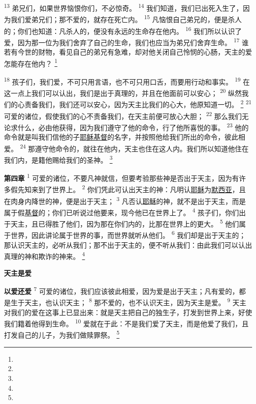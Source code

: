\begin{multicols}{2}
\textsuperscript{13}
弟兄们，如果世界恼恨你们，不必惊奇。
\textsuperscript{14}
我们知道，我们已出死入生了，因为我们爱弟兄们；那不爱的，就存在死亡内。
\textsuperscript{15}
凡恼恨自己弟兄的，便是杀人的；你们也知道：凡杀人的，便没有永远的生命存在他内。
\textsuperscript{16}
我们所以认识了爱，因为那一位为我们舍弃了自己的生命，我们也应当为弟兄们舍弃生命。
\textsuperscript{17}
谁若有今世的财物，看见自己的弟兄有急难，却对他关闭自己怜悯的心肠，天主的爱怎能存在他内？
\footnote{}

\textsuperscript{18}
孩子们，我们爱，不可只用言语，也不可只用口舌，而要用行动和事实。
\textsuperscript{19}
在这一点上我们可以认出，我们是出于真理的，并且在他面前可以安心；
\textsuperscript{20}
纵然我们的心责备我们，我们还可以安心，因为天主比我们的心大，他原知道一切。
\footnote{}
\textsuperscript{21}
可爱的诸位，假使我们的心不责备我们，在天主前便可放心大胆；
\textsuperscript{22}
那么我们无论求什么，必由他获得，因为我们遵守了他的命令，行了他所喜悦的事。
\textsuperscript{23}
他的命令就是叫我们信他的子\uline{耶稣}\uline{基督}的名字，并按照他给我们所出的命令，彼此相爱。
\textsuperscript{24}
那遵守他命令的，就往在他内，天主也住在这人内。我们所以知道他住在我们内，是籍他赐给我们的圣神。
\footnote{}

\textbf{第四章\quad}
\textsuperscript{1}
可爱的诸位，不要凡神就信，但要考验那些神是否出于天主，因为有许多假先知来到了世界上。
\textsuperscript{2}
你们凭此可认出天主的神：凡明认\uline{耶稣}为\uline{默西亚}，且在肉身内降世的神，便是出于天主；
\textsuperscript{3}
凡否认\uline{耶稣}的神，就不是出于天主，而是属于假\uline{基督}的；你们已听说过他要来，现今他已在世界上了。
\textsuperscript{4}
孩子们，你们出于天主，且已得胜了他们，因为那在你们内的，比那在世界上的更大。
\textsuperscript{5}
他们属于世界，因此讲论属于世界的事，而世界就听从他们。
\textsuperscript{6}
我们却是出于天主的；那认识天主的，必听从我们；那不出于天主的，便不听从我们：由此我们可以认出真理的神和欺诈的神来。
\footnote{}

\begin{center}
	\textbf{\large{\songti 天主是爱}}
\end{center}

\textbf{以爱还爱\quad}
\textsuperscript{7}
可爱的诸位，我们应该彼此相爱，因为爱是出于天主；凡有爱的，都是生于天主，也认识天主；
\textsuperscript{8}
那不爱的，也不认识天主，因为天主是爱。
\textsuperscript{9}
天主对我们的爱在这事上已显出来：就是天主把自己的独生子，打发到世界上来，好使我们籍着他得到生命。
\textsuperscript{10}
爱就在于此：不是我们爱了天主，而是他爱了我们，且打发自己的儿子，为我们做赎罪祭。
\footnote{}


\end{multicols}
